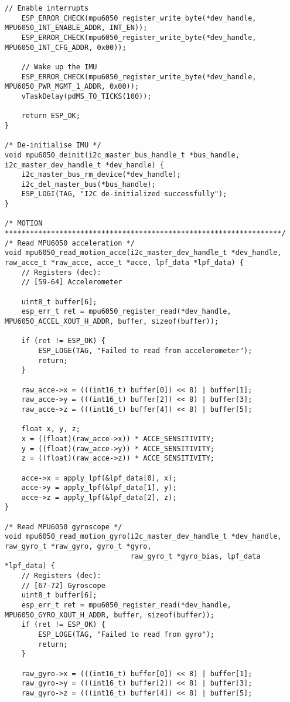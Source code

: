 \begin{lstlisting}[caption={Register Read}]
    // Enable interrupts
    ESP_ERROR_CHECK(mpu6050_register_write_byte(*dev_handle, MPU6050_INT_ENABLE_ADDR, INT_EN));
    ESP_ERROR_CHECK(mpu6050_register_write_byte(*dev_handle, MPU6050_INT_CFG_ADDR, 0x00));

    // Wake up the IMU
    ESP_ERROR_CHECK(mpu6050_register_write_byte(*dev_handle, MPU6050_PWR_MGMT_1_ADDR, 0x00));
    vTaskDelay(pdMS_TO_TICKS(100)); 

    return ESP_OK;
}

/* De-initialise IMU */
void mpu6050_deinit(i2c_master_bus_handle_t *bus_handle, i2c_master_dev_handle_t *dev_handle) {
    i2c_master_bus_rm_device(*dev_handle);
    i2c_del_master_bus(*bus_handle);
    ESP_LOGI(TAG, "I2C de-initialized successfully");
}

/* MOTION ******************************************************************/
/* Read MPU6050 acceleration */
void mpu6050_read_motion_acce(i2c_master_dev_handle_t *dev_handle, raw_acce_t *raw_acce, acce_t *acce, lpf_data *lpf_data) {
    // Registers (dec):
    // [59-64] Accelerometer

    uint8_t buffer[6];
    esp_err_t ret = mpu6050_register_read(*dev_handle, MPU6050_ACCEL_XOUT_H_ADDR, buffer, sizeof(buffer));

    if (ret != ESP_OK) {
        ESP_LOGE(TAG, "Failed to read from accelerometer");
        return;
    }
    
    raw_acce->x = (((int16_t) buffer[0]) << 8) | buffer[1];
    raw_acce->y = (((int16_t) buffer[2]) << 8) | buffer[3];
    raw_acce->z = (((int16_t) buffer[4]) << 8) | buffer[5];
    
    float x, y, z; 
    x = ((float)(raw_acce->x)) * ACCE_SENSITIVITY;
    y = ((float)(raw_acce->y)) * ACCE_SENSITIVITY;
    z = ((float)(raw_acce->z)) * ACCE_SENSITIVITY;

    acce->x = apply_lpf(&lpf_data[0], x);
    acce->y = apply_lpf(&lpf_data[1], y);
    acce->z = apply_lpf(&lpf_data[2], z);
}

/* Read MPU6050 gyroscope */
void mpu6050_read_motion_gyro(i2c_master_dev_handle_t *dev_handle, raw_gyro_t *raw_gyro, gyro_t *gyro,
                              raw_gyro_t *gyro_bias, lpf_data *lpf_data) {
    // Registers (dec):
    // [67-72] Gyroscope
    uint8_t buffer[6];
    esp_err_t ret = mpu6050_register_read(*dev_handle, MPU6050_GYRO_XOUT_H_ADDR, buffer, sizeof(buffer));
    if (ret != ESP_OK) {
        ESP_LOGE(TAG, "Failed to read from gyro");
        return;
    }

    raw_gyro->x = (((int16_t) buffer[0]) << 8) | buffer[1];
    raw_gyro->y = (((int16_t) buffer[2]) << 8) | buffer[3];
    raw_gyro->z = (((int16_t) buffer[4]) << 8) | buffer[5];
    

\end{lstlisting}

